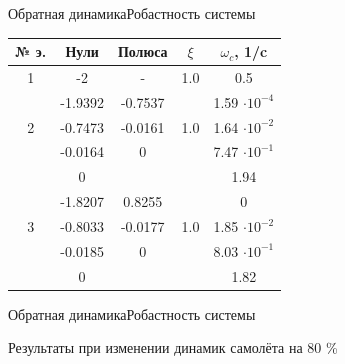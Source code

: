 \begin{frame}{Обратная динамика}{Робастность системы}
\begin{table}[H]
    \begin{tabular}{|c|c|c|c|c|}
        \hline 
        № э.&Нули & Полюса & $\xi$ & $\omega_c$, 1/c \\ \hline 
        1& -2 & - & 1.0 &0.5 \\ \hline
        & -1.9392 & -0.7537  &  & 1.59 $\cdot 10^{-4}$\\ 
        2& -0.7473 & -0.0161  &1.0 & 1.64 $\cdot 10^{-2}$\\ 
        & -0.0164 &  0 & &7.47 $\cdot 10^{-1}$\\ 
        & 0 &   &  &1.94 \\ \hline 
        & -1.8207 & 0.8255 & &0\\ 
        3& -0.8033 & -0.0177 & 1.0&1.85 $\cdot 10^{-2}$\\ 
        & -0.0185 & 0 & &8.03 $\cdot 10^{-1}$ \\ 
        & 0 &  &  &1.82 \\ \hline
    \end{tabular}
\end{table}

\end{frame}

\begin{frame}{Обратная динамика}{Робастность системы}
    \begin{block}{Результаты при изменении динамик самолёта на 80 \%}
    \end{block}
\end{frame}

